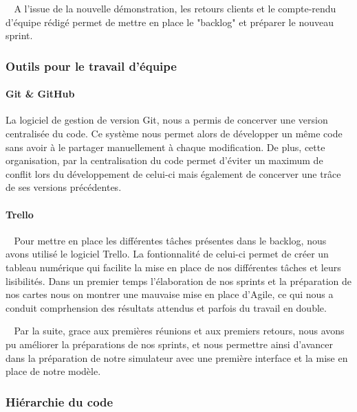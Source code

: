 \documentclass[12pt]{article}
\def\tab{$\>\>\>\>$}
\begin{document}
\tab A l'issue de la nouvelle démonstration, les retours clients et le compte-rendu d'équipe rédigé permet de mettre en place le "backlog" et préparer le nouveau sprint.

\newpage

\subsubsection{Outils pour le travail d'équipe}
\paragraph{Git \& GitHub\\}
La logiciel de gestion de version Git, nous a permis de concerver une version centralisée du code. Ce système nous permet alors de développer un même code sans avoir à le partager manuellement à chaque modification. De plus, cette organisation, par la centralisation du code permet d'éviter un maximum de conflit lors du développement de celui-ci mais également de concerver une trâce de ses versions précédentes.

\paragraph{Trello\\}
\tab Pour mettre en place les différentes tâches présentes dans le backlog, nous avons utilisé le logiciel Trello. La fontionnalité de celui-ci permet de créer un tableau numérique qui facilite la mise en place de nos différentes tâches et leurs lisibilités. Dans un premier temps l'élaboration de nos sprints et la préparation de nos cartes nous on montrer une mauvaise mise en place d'Agile, ce qui nous a conduit comprhension des résultats attendus et parfois du travail en double.

\tab Par la suite, grace aux premières réunions et aux premiers retours, nous avons pu améliorer la préparations de nos sprints, et nous permettre ainsi d'avancer dans la préparation de notre simulateur avec une première interface et la mise en place de notre modèle.


\subsubsection{Hiérarchie du code}
\end{document}
